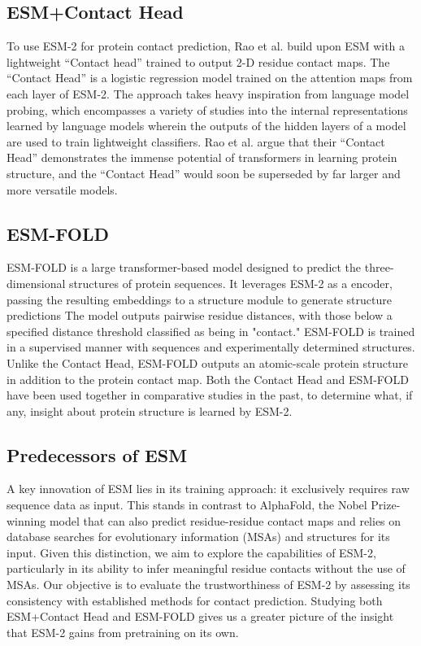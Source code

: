 \documentclass{article}
\begin{document}
\subsection{ESM+Contact Head}

To use ESM-2 for protein contact prediction, Rao et al. build upon ESM with a lightweight ``Contact head'' trained to output 2-D residue contact maps\cite{ESMContactHead}. The ``Contact Head'' is a logistic regression model trained on the attention maps from each layer of ESM-2. The approach takes heavy inspiration from language model probing, which encompasses a variety of studies into the internal representations learned by language models wherein the outputs of the hidden layers of a model are used to train lightweight classifiers. Rao et al. argue that their ``Contact Head'' demonstrates the immense potential of transformers in learning protein structure, and the ``Contact Head'' would soon be superseded by far larger and more versatile models.

\subsection{ESM-FOLD}

ESM-FOLD \cite{ESM-FOLD} is a large transformer-based model designed to predict the three-dimensional structures of protein sequences. It leverages ESM-2 as a encoder, passing the resulting embeddings to a structure module to generate structure predictions The model outputs pairwise residue distances, with those below a specified distance threshold classified as being in "contact." ESM-FOLD is trained in a supervised manner with sequences and experimentally determined structures. Unlike the Contact Head, ESM-FOLD outputs an atomic-scale protein structure in addition to the protein contact map. Both the Contact Head and ESM-FOLD have been used together in comparative studies in the past, to determine what, if any, insight about protein structure is learned by ESM-2. \cite{Zhang}

\subsection{Predecessors of ESM}

A key innovation of ESM lies in its training approach: it exclusively requires raw sequence data as input. This stands in contrast to AlphaFold\cite{AlphaFold}, the Nobel Prize-winning model that can also predict residue-residue contact maps and relies on database searches for evolutionary information (MSAs) and structures for its input. Given this distinction, we aim to explore the capabilities of ESM-2, particularly in its ability to infer meaningful residue contacts without the use of MSAs. Our objective is to evaluate the trustworthiness of ESM-2 by assessing its consistency with established methods for contact prediction. Studying both ESM+Contact Head and ESM-FOLD gives us a greater picture of the insight that ESM-2 gains from pretraining on its own. 
\end{document}
